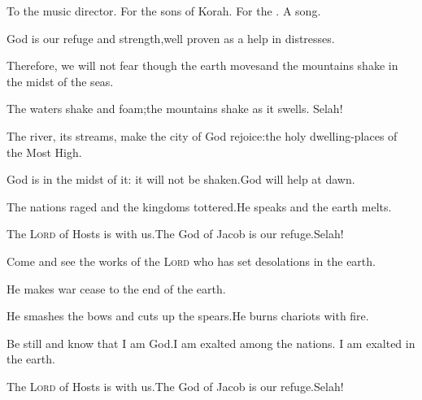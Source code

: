 
\begin{inparaenum}
  \noindent{} To the music director. For the sons of Korah. For the . A song.\smallskip%
  
  \pb {} God is our refuge and strength,\pa well proven as a help in distresses.%
  
  \pb {} Therefore, we will not fear though the earth moves\pa and the mountains shake in the midst of the seas.%
  
  \pb {} The waters shake and foam;\pa the mountains shake as it swells.%
  \pa Selah!%
  
  \pc {} The river,%
  its streams, make%
  the city of God rejoice:\pa the holy dwelling-places of the Most High.%
  
  \pb {} God is in the midst of it: it will not be shaken.\pa God will help at dawn.%
  
  \pb {} The nations raged and the kingdoms tottered.\pa He speaks and the earth melts.%
  
  \pb {} The \textsc{Lord} of Hosts is with us.\pa The God of Jacob is our refuge.\pa Selah!%
  
  \pc {} Come and see the works of the \textsc{Lord}%
  \pa who has set desolations in the earth.%
  
  \pb {} He makes war cease to the end of the earth.%
  
  \pc He smashes the bows and cuts up the spears.\pa He burns chariots%
  with fire.%
  
  \pb {} Be still and know that I am God.\pa I am exalted among the nations. I am exalted in the earth.%
  
  \pb {} The \textsc{Lord} of Hosts is with us.\pa The God of Jacob is our refuge.\pa Selah!%
\end{inparaenum}

